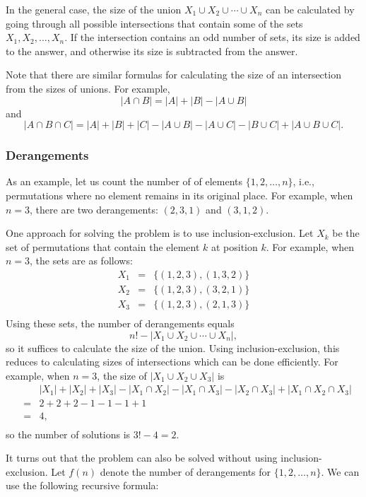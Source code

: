In the general case, the size of the 
union $X_1 \cup X_2 \cup \cdots \cup X_n$
can be calculated by going through all possible
intersections that contain some of the sets $X_1,X_2,\ldots,X_n$.
If the intersection contains an odd number of sets,
its size is added to the answer,
and otherwise its size is subtracted from the answer.

Note that there are similar formulas
for calculating
the size of an intersection from the sizes of
unions. For example,
\[ |A \cap B| = |A| + |B| - |A \cup B|\]
and
\[ |A \cap B \cap C| = |A| + |B| + |C| - |A \cup B|  - |A \cup C|  - |B \cup C| + |A \cup B \cup C| .\]

\subsubsection{Derangements}


As an example, let us count the number of 
of elements $\{1,2,\ldots,n\}$, i.e., permutations
where no element remains in its original place.
For example, when $n=3$, there are
two derangements: $(2,3,1)$ and $(3,1,2)$.

One approach for solving the problem is to use
inclusion-exclusion.
Let $X_k$ be the set of permutations
that contain the element $k$ at position $k$.
For example, when $n=3$, the sets are as follows:
\[
\begin{array}{lcl}
X_1 & = & \{(1,2,3),(1,3,2)\} \\
X_2 & = & \{(1,2,3),(3,2,1)\} \\
X_3 & = & \{(1,2,3),(2,1,3)\} \\
\end{array}
\]
Using these sets, the number of derangements equals
\[ n! - |X_1 \cup X_2 \cup \cdots \cup X_n|, \]
so it suffices to calculate the size of the union.
Using inclusion-exclusion, this reduces to
calculating sizes of intersections which can be
done efficiently.
For example, when $n=3$, the size of
$|X_1 \cup X_2 \cup X_3|$ is
\[
\begin{array}{lcl}
 & & |X_1| + |X_2| + |X_3| - |X_1 \cap X_2|  - |X_1 \cap X_3|  - |X_2 \cap X_3| + |X_1 \cap X_2 \cap X_3| \\
 & = & 2+2+2-1-1-1+1 \\
 & = & 4, \\
\end{array}
\]
so the number of solutions is $3!-4=2$.

It turns out that the problem can also be solved
without using inclusion-exclusion.
Let $f(n)$ denote the number of derangements
for $\{1,2,\ldots,n\}$. We can use the following
recursive formula:

